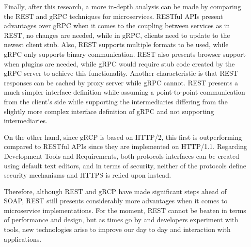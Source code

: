 \documentclass[conference]{IEEEtran}
\begin{document}
Finally, after this research, a more in-depth analysis can be made by comparing the REST and gRPC techniques for microservices. RESTful APIs present advantages over gRPC when it comes to the coupling between services as in REST, no changes are needed, while in gRPC, clients need to update to the newest client stub. Also, REST supports multiple formats to be used, while gRPC only supports binary communication. REST also presents browser support when plugins are needed, while gRPC would require stub code created by the gRPC server to achieve this functionality. Another characteristic is that REST responses can be cached by proxy server while gRPC cannot. REST presents a much simpler interface definition while assuming a point-to-point communication from the client's side while supporting the intermediaries differing from the slightly more complex interface definition of gRPC and not supporting intermediaries.

On the other hand, since gRCP is based on HTTP/2, this first is outperforming compared to RESTful APIs since they are implemented on HTTP/1.1. Regarding Development Tools and Requirements, both protocols interfaces can be created using default text editors, and in terms of security, neither of the protocols define security mechanisms and HTTPS is relied upon instead.

Therefore, although REST and gRCP have made significant steps ahead of SOAP, REST still presents considerably more advantages when it comes to microservice implementations. For the moment, REST cannot be beaten in terms of performance and design, but as times go by and developers experiment with tools, new technologies arise to improve our day to day and interaction with applications.


\end{document}
